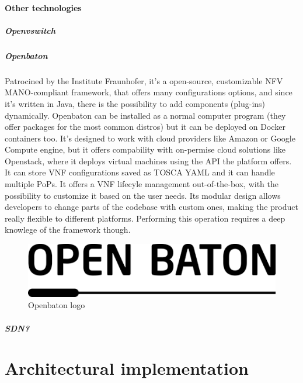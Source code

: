 \documentclass[10pt]{book}
\begin{document}





\subsubsection{Other technologies}
\paragraph{Openvswitch}
\paragraph{Openbaton} Patrocined by the Institute Fraunhofer, it's a 
open-source, customizable NFV MANO-compliant framework, that offers many
configurations options, and since it's written in Java, there is the possibility
to add components (plug-ins) dynamically. Openbaton can be installed as a normal
computer program (they offer packages for the most common distros) but it can be
deployed on Docker containers too. It's designed to work with cloud providers
like Amazon or Google Compute engine, but it offers compability with on-permise
cloud solutions like Openstack, where it deploys virtual machines using the API
the platform offers. It can store VNF configurations saved as TOSCA
YAML and it can handle multiple
PoPs. It offers a VNF lifecyle management
out-of-the-box, with the possibility to customize it based on the user needs.
Its modular design allows developers to change parts of the codebase with custom
ones, making the product really flexible to different platforms. Performing this
operation requires a deep knowlege of the framework though.
\begin{figure}[h]
 \centering \includegraphics[scale=0.45]{openbaton_logo}
 \caption{Openbaton logo}
 \label{chap:prjan:img:openbaton_logo}
\end{figure}

\paragraph{SDN?}

\chapter{Architectural implementation}
\label{chap:archimpl}
\end{document}
